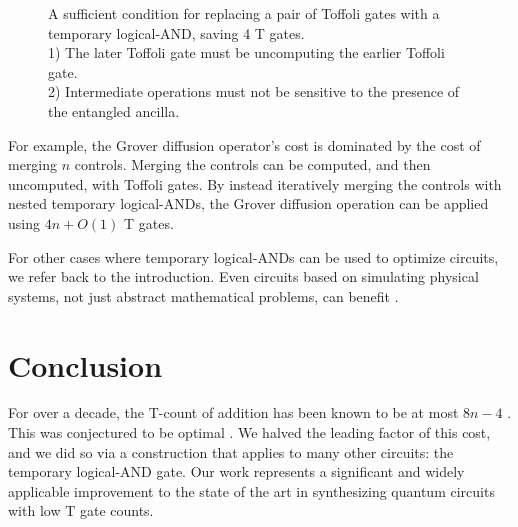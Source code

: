 \documentclass{quantumarticle-customized}
\begin{document}
\begin{figure}
  \caption{
	A sufficient condition for replacing a pair of Toffoli gates with a temporary logical-AND, saving 4 T gates.\\
	1) The later Toffoli gate must be uncomputing the earlier Toffoli gate.\\
	2) Intermediate operations must not be sensitive to the presence of the entangled ancilla.
  }
  \label{fig:pair-definition}
\end{figure}

For example, the Grover diffusion operator's cost is dominated by the cost of merging $n$ controls.
Merging the controls can be computed, and then uncomputed, with Toffoli gates.
By instead iteratively merging the controls with nested temporary logical-ANDs, the Grover diffusion operation can be applied using $4n + O(1)$ T gates.

For other cases where temporary logical-ANDs can be used to optimize circuits, we refer back to the introduction.
Even circuits based on simulating physical systems, not just abstract mathematical problems, can benefit \citep{RyanEmails2017}.


\section{Conclusion}
\label{sec:conclusion}

For over a decade, the T-count of addition has been known to be at most $8n - 4$ \citep{Amy2013, Barenco1995, Cuccaro2004}.
This was conjectured to be optimal \citep{AustinDiscussionsAndEmails2017}.
We halved the leading factor of this cost, and we did so via a construction that applies to many other circuits: the temporary logical-AND gate.
Our work represents a significant and widely applicable improvement to the state of the art in synthesizing quantum circuits with low T gate counts.
\end{document}
